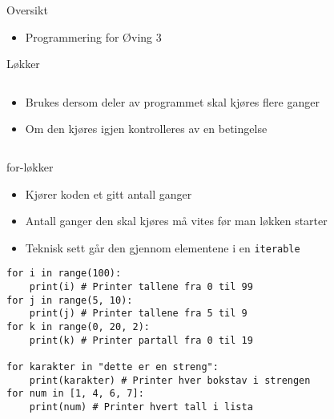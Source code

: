 \documentclass[screen, aspectratio=169]{beamer}
\begin{document}
\begin{frame}{Oversikt}
	\begin{itemize}
		\item Programmering for Øving 3
	\end{itemize}
\end{frame}

\begin{frame}{Løkker}
	\begin{columns}
		\begin{column}{.4\textwidth}
			\begin{itemize}
				\item Brukes dersom deler av programmet skal kjøres flere ganger
				\item Om den kjøres igjen kontrolleres av en betingelse
			\end{itemize}
		\end{column}
		\begin{column}{.6\textwidth}
			\raggedright
		\end{column}
	\end{columns}
\end{frame}

\begin{frame}[fragile]{for-løkker}
	\begin{itemize}
		\item Kjører koden et gitt antall ganger
		\item Antall ganger den skal kjøres må vites før man løkken starter
		\item Teknisk sett går den gjennom elementene i en \lstinline|iterable|
	\end{itemize}
	\vspace{-1em}
	\begin{lstlisting}
for i in range(100):
	print(i) # Printer tallene fra 0 til 99
for j in range(5, 10):
	print(j) # Printer tallene fra 5 til 9
for k in range(0, 20, 2):
	print(k) # Printer partall fra 0 til 19
	
for karakter in "dette er en streng":
	print(karakter) # Printer hver bokstav i strengen
for num in [1, 4, 6, 7]:
	print(num) # Printer hvert tall i lista
	\end{lstlisting}
\end{frame}
\end{document}
